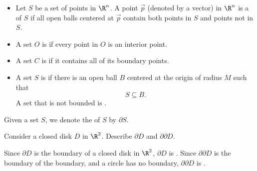 \documentclass{ximera}
\begin{document}
\begin{definition}
\begin{itemize}
  \item Let $S$ be a set of points in $\R^n$. A point $\vec{p}$ (denoted by a vector) in $\R^n$ is
    a  of $S$ if all open balls centered at $\vec{p}$
    contain both points in $S$ and points not in $S$.
    \begin{image}
  \end{image}
  \item A set $O$ is  if every point in $O$ is an interior
    point.
    \begin{image}
    \end{image}
  \item A set $C$ is  if it contains all of its boundary
    points.
    \begin{image}
    \end{image}
  \item A set $S$ is  if there is an open ball $B$
    centered at the origin of radius $M$ such that
    \[
    S\subseteq B.
    \]
    A set that is not bounded is .
  \end{itemize}
  \item Given a set $S$, we denote the  of $S$ by
    $\partial S$.
\end{definition}


\begin{example}
  Consider a closed disk $D$ in $\R^2$. Describe $\partial D$ and $\partial \partial D$.
  \begin{explanation}
    Since $\partial D$ is the boundary of a closed disk in $\R^2$, $\partial D$ is . Since $\partial\partial D$ is the boundary of the boundary, and a circle has no boundary, $\partial\partial D$ is .
  \end{explanation}
\end{example}
\end{document}
